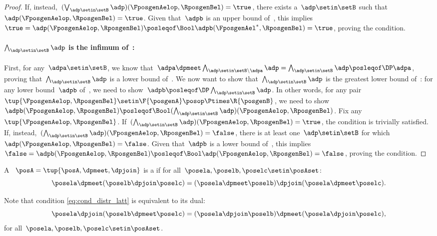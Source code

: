 \begin{proof}
    If, instead,~$(\bigvee_{\adp \setin \setB} \adp)(\FposgenAelop,\RposgenBel)=\true$, there exists a~$\adp\setin \setB$ such that~$\adp(\FposgenAelop,\RposgenBel)=\true$.
    Given that~$\adpb$ is an upper bound of~\setB, this implies~$\true=\adp(\FposgenAelop,\RposgenBel)\posleqof\Bool \adpb(\FposgenAel^*,\RposgenBel)=\true$, proving the condition.

    \paragraph*{$\bigwedge_{\adp \setin \setB} \adp$ is the infimum of~\setB:}
    First, for any~$\adpa\setin \setB$, we know that~$\adpa \dpmeet \bigwedge_{\adp \setin \setB \backslash \adpa} \adp= \bigwedge_{\adp \setin \setB} \adp \posleqof\DP \adpa$, proving that~$\bigwedge_{\adp \setin \setB} \adp$ is a lower bound of~\setB.
    We now want to show that~$\bigwedge_{\adp \setin \setB} \adp$ is the greatest lower bound of~\setB: for any lower bound~$\adpb$ of~\setB, we need to show~$\adpb\posleqof\DP\bigwedge_{\adp \setin \setB} \adp $.
    In other words, for any pair~$\tup{\FposgenAelop,\RposgenBel}\setin \F{\posgenA}\posop \Ptimes \R{\posgenB}$, we need to show~$\adpb(\FposgenAelop,\RposgenBel) \posleqof\Bool (\bigwedge_{\adp \setin \setB} \adp)(\FposgenAelop,\RposgenBel)$.
    Fix any~$\tup{\FposgenAelop,\RposgenBel}$.
    If~$(\bigwedge_{\adp \setin \setB} \adp)(\FposgenAelop,\RposgenBel)=\true$, the condition is trivially satisfied.
    If, instead,~$(\bigwedge_{\adp \setin \setB} \adp)(\FposgenAelop,\RposgenBel)=\false$, there is at least one~$\adp\setin \setB$ for which~$\adp(\FposgenAelop,\RposgenBel)=\false$.
    Given that~$\adpb$ is a lower bound of~\setB, this implies~$\false=\adpb(\FposgenAelop,\RposgenBel)\posleqof\Bool \adp(\FposgenAelop,\RposgenBel)=\false$, proving the condition.
\end{proof}

\begin{definition}
    \label{def:distributive-lattice}
    A ~$\posA=\tup{\posA,{{\dpmeet}}, {{\dpjoin}}}$ is a  if for all~$\posela,\poselb,\poselc\setin \posAset$:
    \begin{equation}
        \label{eq:cond_distr_latt}
        \posela \dpmeet (\poselb \dpjoin \poselc)=(\posela \dpmeet \poselb)\dpjoin (\posela \dpmeet \poselc).
    \end{equation}
\end{definition}
\begin{remark}
    Note that condition \cref{eq:cond_distr_latt} is equivalent to its dual:
    \begin{equation}
        \posela \dpjoin (\poselb\dpmeet \poselc)=(\posela \dpjoin \poselb)\dpmeet (\posela\dpjoin \poselc),
    \end{equation}
    for all~$\posela,\poselb,\poselc\setin \posAset$.
\end{remark}

